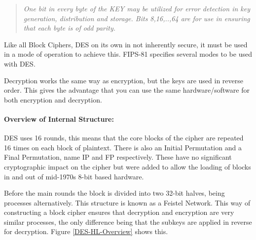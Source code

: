 \begin{quote}
\textit{One bit in every byte of the KEY may be utilized for error detection in key generation, distribution and storage. Bits 8,16,..,64 are for use in ensuring that each byte is of odd parity.}
\end{quote}

Like all Block Ciphers, DES on its own in not inherently secure, it must be used in a mode of operation to achieve this. FIPS-81 specifies several modes to be used with DES.

Decryption works the same way as encryption, but the keys are used in reverse order. This gives the advantage that you can use the same hardware/software for both encryption and decryption.

\paragraph{Overview of Internal Structure:}

DES uses 16 rounds, this means that the core blocks of the cipher are repeated 16 times on each block of plaintext. There is also an Initial Permutation and a Final Permutation, name IP and FP respectively. These have no significant cryptographic impact on the cipher but were added to allow the loading of blocks in and out of mid-1970s 8-bit based hardware. 

Before the main rounds the block is divided into two 32-bit halves, being processes alternatively. This structure is known as a Feistel Network. This way of constructing a block cipher ensures that decryption and encryption are very similar processes, the only difference being that the subkeys are applied in reverse for decryption. Figure \ref{DES-HL-Overview} shows this.

